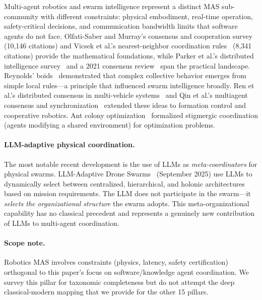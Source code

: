 \documentclass{article}
\begin{document}
Multi-agent robotics and swarm intelligence represent a distinct MAS sub-community with
different constraints: physical embodiment, real-time operation, safety-critical
decisions, and communication bandwidth limits that software agents do not face.
Olfati-Saber and Murray's consensus and cooperation
survey~\citep{sutra39_consensus2007} (10,146 citations) and Vicsek et al.'s
nearest-neighbor coordination rules~\citep{sutra40_coordination2003} (8,341 citations)
provide the mathematical foundations, while Parker et al.'s distributed intelligence
survey~\citep{sutra18523_distributed2008} and a 2021 consensus
review~\citep{sutra341_consensus2021} span the practical landscape.
Reynolds' boids~\citep{reynolds1987flocks} demonstrated that complex collective behavior
emerges from simple local rules---a principle that influenced swarm intelligence broadly.
Ren et al.'s distributed consensus in multi-vehicle
systems~\citep{sutra113_distributed2007} and Qin et al.'s multiagent consensus and
synchronization~\citep{sutra51_consensus2009} extended these ideas to formation
control and cooperative robotics.
Ant colony optimization~\citep{dorigo1996ant} formalized stigmergic coordination (agents
modifying a shared environment) for optimization problems.

\paragraph{LLM-adaptive physical coordination.}
The most notable recent development is the use of LLMs as \emph{meta-coordinators} for
physical swarms. LLM-Adaptive Drone Swarms~\citep{llmdrone2025} (September 2025) use
LLMs to dynamically select between centralized, hierarchical, and holonic architectures
based on mission requirements. The LLM does not participate in the swarm---it
\emph{selects the organizational structure} the swarm adopts. This meta-organizational
capability has no classical precedent and represents a genuinely new contribution of
LLMs to multi-agent coordination.

\paragraph{Scope note.}
Robotics MAS involves constraints (physics, latency, safety certification) orthogonal
to this paper's focus on software/knowledge agent coordination. We survey this pillar
for taxonomic completeness but do not attempt the deep classical-modern mapping that we
provide for the other 15 pillars.
\end{document}
